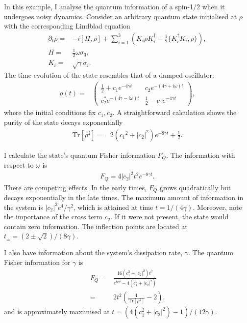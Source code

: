 \documentclass[12pt]{article}
\newcommand{\Tr}{\mathrm{Tr}}
\begin{document}
In this example, I analyse the quantum information of a spin-1/2 when it undergoes noisy dynamics.  Consider an arbitrary quantum state initialised at $\rho$ with the corresponding Lindblad equation
\begin{align}
    \partial_t \rho = & - i [H, \rho] + \sum_{i=1}^{3}\left( K_i \rho K_i^\dagger - \frac{1}{2}\{K_i^\dagger K_i, \rho \}\right),\\
    H = & \frac{1}{2}\omega \sigma_3,\\
    K_i = & \sqrt{\gamma} \sigma_i.
\end{align}
The time evolution of the state resembles that of a damped oscillator:
\begin{align}
    \rho(t) = &
    \begin{pmatrix}
    \frac{1}{2} + c_1 e^{- 4 \gamma t} & c_2 e^{- (4 \gamma + i \omega) t}\\
    c_2^* e^{- (4 \gamma - i \omega) t} & \frac{1}{2} - c_1 e^{- 4 \gamma t}
\end{pmatrix},
\end{align}
where the initial conditions fix $c_1, c_2$. A straightforward calculation shows the purity of the state decays exponentially
\begin{align}
    \Tr [\rho^2] = & 2\left(c_1{}^2+|c_2|^2\right) e^{-8 \gamma  t}+\frac{1}{2}.
\end{align}

I calculate the state's quantum Fisher information $F_Q$. The information with respect to $\omega$ is 
\begin{align}
    F_{Q} = 4 |c_2|^2 t^2 e^{-8 \gamma  t}.
\end{align}
There are competing effects.  In the early times, $F_Q$ grows quadratically but decays exponentially in the late times.  The maximum amount of information in the system is $|c_2|^2 e^{4}/\gamma^2$, which is attained at time $t=1/(4\gamma)$. Moreover, note the importance of the cross term $c_2$.  If it were not present, the state would contain zero information.  The inflection points are located at $t_{\pm} = (2 \pm \sqrt{2})/(8 \gamma)$. 

I also have information about the system's dissipation rate, $\gamma$.  The quantum Fisher information for $\gamma$ is
\begin{align}
    F_{Q} = & \frac{16 \left(c_1^2+|c_2|^2\right) t^2 }{ e^{8 \gamma t}-4(c_1^2+|c_2|^2)}\\
    = & 2t^2 \left(\frac{1}{\Tr[\rho^2]} - 2 \right).
\end{align}
and is approximately maximised at $t =(4(c_1^2 + |c_2|^2) - 1)/(12 \gamma)$.
\end{document}
